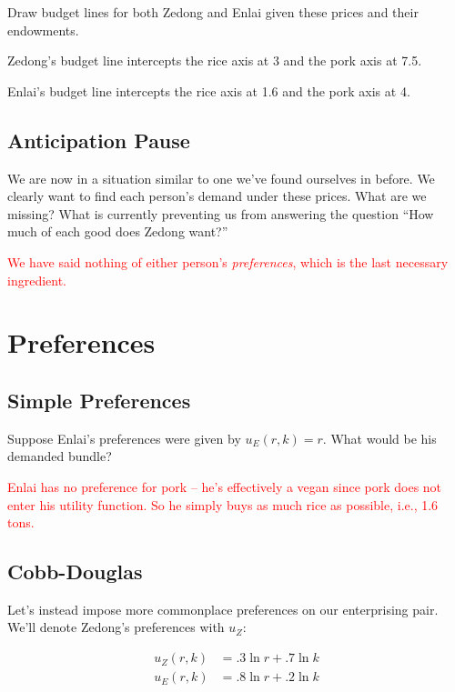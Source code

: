 \documentclass{article}
\newenvironment{solution}{\color{red}}{\color{black}}
\begin{document}
Draw budget lines for both Zedong and Enlai given these prices and their endowments. 

\begin{solution}
Zedong's budget line intercepts the rice axis at 3 and the pork axis at 7.5.

Enlai's budget line intercepts the rice axis at 1.6 and the pork axis at 4.
\end{solution}

\subsection{Anticipation Pause}

We are now in a situation similar to one we've found ourselves in before. We clearly want to find each person's demand under these prices. What are we missing? What is currently preventing us from answering the question ``How much of each good does Zedong want?''

\textcolor{red}{We have said nothing of either person's \textit{preferences}, which is the last necessary ingredient.} 

\section{Preferences}

\subsection{Simple Preferences}

Suppose Enlai's preferences were given by $u_E(r, k) = r$. What would be his demanded bundle?

\textcolor{red}{Enlai has no preference for pork -- he's effectively a vegan since pork does not enter his utility function. So he simply buys as much rice as possible, i.e., 1.6 tons.} 

\subsection{Cobb-Douglas}

Let's instead impose more commonplace preferences on our enterprising pair. We'll denote Zedong's preferences with $u_Z$:

\begin{align*}
u_Z(r, k) &= .3 \ln r + .7 \ln k \\
u_E(r, k) &= .8 \ln r + .2 \ln k
\end{align*}
\end{document}
